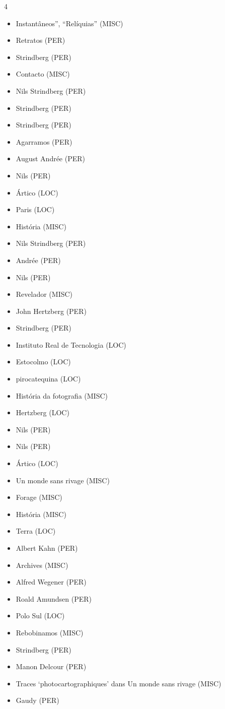 \documentclass{article}
\begin{document}
\begin{multicols}{4}
\begin{itemize}
\item Instantâneos”, “Relíquias” (MISC)
\item Retratos (PER)
\item Strindberg (PER)
\item Contacto (MISC)
\item Nils Strindberg (PER)
\item Strindberg (PER)
\item Strindberg (PER)
\item Agarramos (PER)
\item August Andrée (PER)
\item Nils (PER)
\item Ártico (LOC)
\item Paris (LOC)
\item História (MISC)
\item Nils Strindberg (PER)
\item Andrée (PER)
\item Nils (PER)
\item Revelador (MISC)
\item John Hertzberg (PER)
\item Strindberg (PER)
\item Instituto Real de Tecnologia (LOC)
\item Estocolmo (LOC)
\item pirocatequina (LOC)
\item História da fotografia (MISC)
\item Hertzberg (LOC)
\item Nils (PER)
\item Nils (PER)
\item Ártico (LOC)
\item Un monde sans rivage (MISC)
\item Forage (MISC)
\item História (MISC)
\item Terra (LOC)
\item Albert Kahn (PER)
\item Archives (MISC)
\item Alfred Wegener (PER)
\item Roald Amundsen (PER)
\item Polo Sul (LOC)
\item Rebobinamos (MISC)
\item Strindberg (PER)
\item Manon Delcour (PER)
\item Traces ‘photocartographiques’ dans Un monde sans rivage (MISC)
\item Gaudy (PER)

\end{itemize}
\end{multicols}
\end{document}
